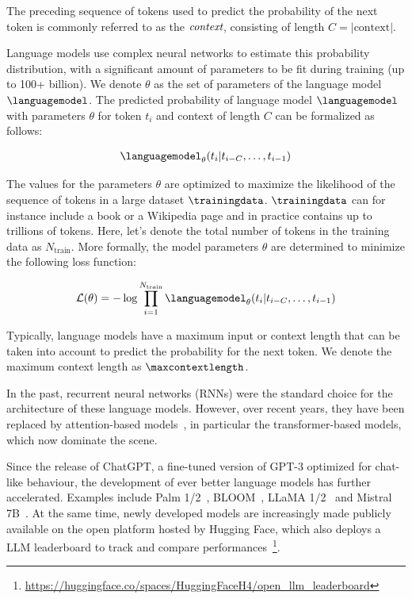 \documentclass[twocolumn,10pt]{article}
\begin{document}
The preceding sequence of tokens used to predict the probability of the next token is commonly referred to as the $\emph{context}$, consisting of length $C = |\text{context}|$.

Language models use complex neural networks to estimate this probability distribution, with a significant amount of parameters to be fit during training (up to 100+ billion). We denote $\theta$ as the set of parameters of the language model $\languagemodel$.
The predicted probability of language model $\languagemodel$ with parameters $\theta$ for token $t_i$ and context of length $C$ can be formalized as follows:

\begin{align}
\languagemodel_{\theta}(t_i | t_{i-C}, \ldots, t_{i-1})
\end{align}
\label{eq:pred_proba}

The values for the parameters $\theta$ are optimized to maximize the likelihood of the sequence of tokens in a large dataset $\trainingdata$. $\trainingdata$ can for instance include a book or a Wikipedia page and in practice contains up to trillions of tokens. Here, let's denote the total number of tokens in the training data as $N_\text{train}$. More formally, the model parameters $\theta$ are determined to minimize the following loss function:

\begin{align}
\mathcal{L}(\theta) = -\log \prod_{i=1}^{N_\text{train}} \languagemodel_{\theta}(t_i | t_{i-C}, \ldots, t_{i-1})
\end{align} 

Typically, language models have a maximum input or context length that can be taken into account to predict the probability for the next token. We denote the maximum context length as $\maxcontextlength$. 

In the past, recurrent neural networks (RNNs) were the standard choice for the architecture of these language models. However, over recent years, they have been replaced by attention-based models~\cite{vaswani2017attention}, in particular the transformer-based models, which now dominate the scene. 

Since the release of ChatGPT, a fine-tuned version of GPT-3 optimized for chat-like behaviour, the development of ever better language models has further accelerated. Examples include Palm 1/2~\cite{chowdhery2022palm,anil2023palm}, BLOOM~\cite{scao2022bloom}, LLaMA 1/2~\cite{touvron2023llama,touvron2023llama2} and Mistral 7B~\cite{jiang2023mistral}. At the same time, newly developed models are increasingly made publicly available on the open platform hosted by Hugging Face, which also deploys a LLM leaderboard to track and compare performances~\footnote{\url{https://huggingface.co/spaces/HuggingFaceH4/open_llm_leaderboard}}.
\end{document}
